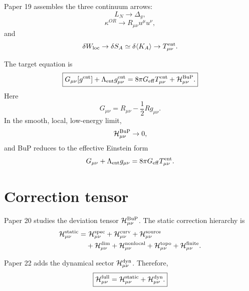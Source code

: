 \documentclass[11pt,a4paper]{article}
\begin{document}
Paper 19 assembles the three continuum arrows:
\begin{equation}
  L_N\to\Delta_g,
\end{equation}
\begin{equation}
  \kappa^{OR}\to R_{\mu\nu}u^\mu u^\nu,
\end{equation}
and
\begin{equation}
  \delta W_{\rm loc}
  \to
  \delta S_A
  \simeq
  \delta\langle K_A\rangle
  \to
  T_{\mu\nu}^{\rm ent}.
\end{equation}

The target equation is
\begin{equation}
  \boxed{
  G_{\mu\nu}[g^{\rm ent}]
  +
  \Lambda_{\rm ent}g_{\mu\nu}^{\rm ent}
  =
  8\pi G_{\rm eff}T_{\mu\nu}^{\rm ent}
  +
  \mathcal H_{\mu\nu}^{\rm BuP}.
  }
\end{equation}
Here
\begin{equation}
  G_{\mu\nu}=R_{\mu\nu}-\frac12Rg_{\mu\nu}.
\end{equation}
In the smooth, local, low-energy limit,
\begin{equation}
  \mathcal H_{\mu\nu}^{\rm BuP}\to0,
\end{equation}
and BuP reduces to the effective Einstein form
\begin{equation}
  G_{\mu\nu}+\Lambda_{\rm ent}g_{\mu\nu}
  =
  8\pi G_{\rm eff}T_{\mu\nu}^{\rm ent}.
\end{equation}

\section{Correction tensor}

Paper 20 studies the deviation tensor \(\mathcal H_{\mu\nu}^{\rm BuP}\). The
static correction hierarchy is
\begin{equation}
\begin{aligned}
  \mathcal H_{\mu\nu}^{\rm static}
  =
  &\ \mathcal H_{\mu\nu}^{\rm spec}
  +
  \mathcal H_{\mu\nu}^{\rm curv}
  +
  \mathcal H_{\mu\nu}^{\rm source} \\
  &+
  \mathcal H_{\mu\nu}^{\rm dim}
  +
  \mathcal H_{\mu\nu}^{\rm nonlocal}
  +
  \mathcal H_{\mu\nu}^{\rm topo}
  +
  \mathcal H_{\mu\nu}^{\rm finite}.
\end{aligned}
\label{eq:static_H}
\end{equation}

Paper 22 adds the dynamical sector \(\mathcal H_{\mu\nu}^{\rm dyn}\). Therefore,
\begin{equation}
  \boxed{
  \mathcal H_{\mu\nu}^{\rm full}
  =
  \mathcal H_{\mu\nu}^{\rm static}
  +
  \mathcal H_{\mu\nu}^{\rm dyn}.
  }
\end{equation}
\end{document}
